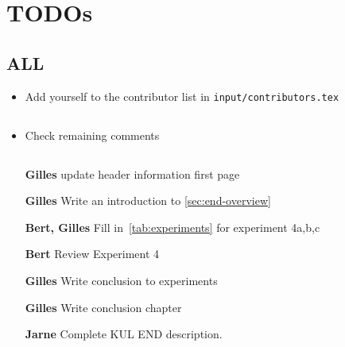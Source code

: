 \chapter{TODOs}

\section*{ALL}
\begin{itemize}
    \item Add yourself to the contributor list in \texttt{input/contributors.tex}
\end{itemize}

\section*{\blooloc{}}

\begin{itemize}
    \item Check remaining comments
\end{itemize}

\section*{\kul{}}

\begin{itemize}
    \item[\textbf{Gilles}] update header information first page
    \item[\textbf{Gilles}]  Write an introduction to \cref{sec:end-overview}
    \item[\textbf{Bert, Gilles}]  Fill in~\cref{tab:experiments} for experiment 4a,b,c
    \item[\textbf{Bert}] Review Experiment 4
    \item[\textbf{Gilles}] Write conclusion to experiments
    \item[\textbf{Gilles}]  Write conclusion chapter
    \item[\textbf{Jarne}] Complete KUL END description.
\end{itemize}


\section*{\lu{}}

